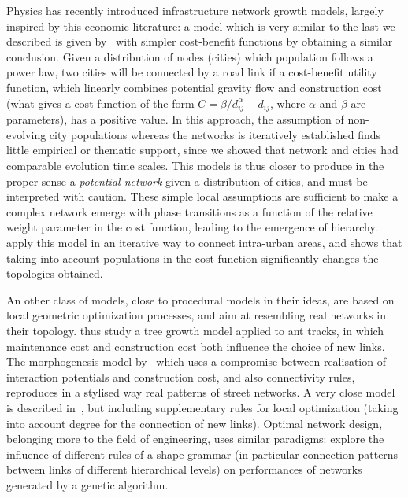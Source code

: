 \documentclass[10pt]{article}
\begin{document}
Physics has recently introduced infrastructure network growth models, largely inspired by this economic literature: a model which is very similar to the last we described is given by~\cite{louf2013emergence} with simpler cost-benefit functions by obtaining a similar conclusion. Given a distribution of nodes (cities) which population follows a power law, two cities will be connected by a road link if a cost-benefit utility function, which linearly combines potential gravity flow and construction cost (what gives a cost function of the form $C = \beta / d_{ij}^{\alpha} - d_{ij}$, where $\alpha$ and $\beta$ are parameters), has a positive value. In this approach, the assumption of non-evolving city populations whereas the networks is iteratively established finds little empirical or thematic support, since we showed that network and cities had comparable evolution time scales. This models is thus closer to produce in the proper sense a \emph{potential network} given a distribution of cities, and must be interpreted with caution. These simple local assumptions are sufficient to make a complex network emerge with phase transitions as a function of the relative weight parameter in the cost function, leading to the emergence of hierarchy. \cite{zhao2016population} apply this model in an iterative way to connect intra-urban areas, and shows that taking into account populations in the cost function significantly changes the topologies obtained.
 
An other class of models, close to procedural models in their ideas, are based on local geometric optimization processes, and aim at resembling real networks in their topology. \cite{bottinelli2017balancing} thus study a tree growth model applied to ant tracks, in which maintenance cost and construction cost both influence the choice of new links. The morphogenesis model by~\cite{courtat2011mathematics} which uses a compromise between realisation of interaction potentials and construction cost, and also connectivity rules, reproduces in a stylised way real patterns of street networks. A very close model is described in~\cite{rui2013exploring}, but including supplementary rules for local optimization (taking into account degree for the connection of new links). Optimal network design, belonging more to the field of engineering, uses similar paradigms: \cite{vitins2010patterns} explore the influence of different rules of a shape grammar (in particular connection patterns between links of different hierarchical levels) on performances of networks generated by a genetic algorithm.
\end{document}

